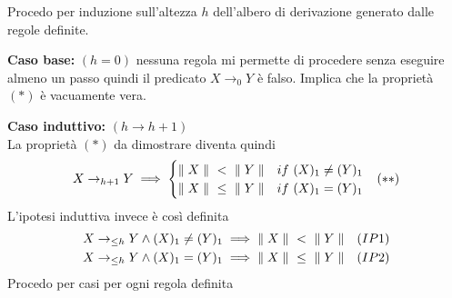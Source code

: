 Procedo per induzione sull'altezza $h$ dell'albero di derivazione generato dalle
regole definite.\newline

\textbf{Caso base:} $(h = 0)$ nessuna regola mi permette di procedere
senza eseguire almeno un passo quindi il predicato $X \to_0 Y$ è falso.
Implica che la proprietà $(*)$ è vacuamente vera.\newline

\textbf{Caso induttivo:} $(h \to h+1)$\\
La proprietà $(*)$ da dimostrare diventa quindi
\begin{align*}
  X \to_{h+1} Y \implies
  \begin{cases}
   {\parallel X\parallel}\ <\ {\parallel Y\parallel} &if\ (X)_1 \neq (Y)_1\\
   {\parallel X\parallel}\ \leq\ {\parallel Y\parallel} &if\ (X)_1 = (Y)_1
  \end{cases}
  && (**)
\end{align*}
L'ipotesi induttiva invece è così definita
\begin{align*}
  X \to_{\leq h} Y \land (X)_1 \neq (Y)_1 \implies \req{X}\ <\ \req{Y} &&(IP1)\\
  X \to_{\leq h} Y \land (X)_1 = (Y)_1 \implies \req{X}\ \leq\ \req{Y} &&(IP2)
\end{align*}
Procedo per casi per ogni regola definita
